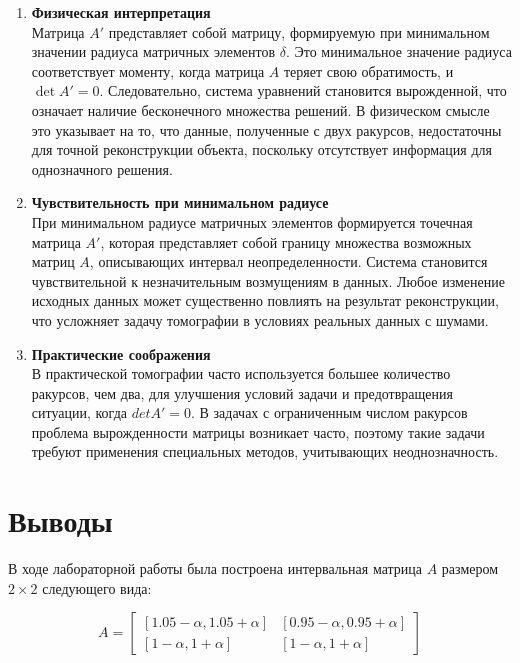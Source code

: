 \documentclass{article}
\begin{document}
  \begin{enumerate}
    \item \textbf{Физическая интерпретация} \\
      Матрица \( A' \) представляет собой матрицу, формируемую при
      минимальном значении радиуса матричных элементов \( \delta \). Это
      минимальное значение радиуса соответствует моменту, когда матрица
      \( A \) теряет свою обратимость, и \( \det A' = 0 \). Следовательно,
      система уравнений становится вырожденной, что означает наличие
      бесконечного множества решений. В физическом смысле это указывает на
      то, что данные, полученные с двух ракурсов, недостаточны для точной
      реконструкции объекта, поскольку отсутствует информация для
      однозначного решения.
    \item \textbf{Чувствительность при минимальном радиусе} \\
      При минимальном радиусе матричных элементов формируется точечная
      матрица \( A' \), которая представляет собой границу множества
      возможных матриц \( A \), описывающих интервал неопределенности.
      Система становится чувствительной к незначительным возмущениям в
      данных. Любое изменение исходных данных может существенно повлиять
      на результат реконструкции, что усложняет задачу томографии в
      условиях реальных данных с шумами.
    \item \textbf{Практические соображения} \\
      В практической томографии часто используется большее количество
      ракурсов, чем два, для улучшения условий задачи и предотвращения
      ситуации, когда \( detA' = 0 \). В задачах с ограниченным числом
      ракурсов проблема вырожденности матрицы возникает часто, поэтому
      такие задачи требуют применения специальных методов, учитывающих
      неоднозначность.
  \end{enumerate}

  \section{Выводы}

  В ходе лабораторной работы была построена интервальная матрица \(A\)
  размером \(2 \times 2\) следующего вида:

  \[
    A = \begin{bmatrix}
      [1.05 - \alpha, 1.05 + \alpha] & [0.95 - \alpha, 0.95 + \alpha] \\
      [1 - \alpha, 1 + \alpha] & [1 - \alpha, 1 + \alpha]
    \end{bmatrix}
  \]
\end{document}

